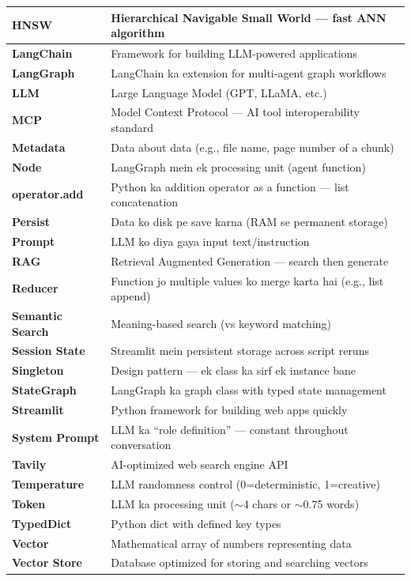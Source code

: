 \documentclass[12pt, a4paper]{article}
\begin{document}
\begin{longtable}{|>{\bfseries\small}p{4cm}|p{9.5cm}|}
HNSW & Hierarchical Navigable Small World --- fast ANN algorithm \\
\hline
LangChain & Framework for building LLM-powered applications \\
\hline
LangGraph & LangChain ka extension for multi-agent graph workflows \\
\hline
LLM & Large Language Model (GPT, LLaMA, etc.) \\
\hline
MCP & Model Context Protocol --- AI tool interoperability standard \\
\hline
Metadata & Data about data (e.g., file name, page number of a chunk) \\
\hline
Node & LangGraph mein ek processing unit (agent function) \\
\hline
operator.add & Python ka addition operator as a function --- list concatenation \\
\hline
Persist & Data ko disk pe save karna (RAM se permanent storage) \\
\hline
Prompt & LLM ko diya gaya input text/instruction \\
\hline
RAG & Retrieval Augmented Generation --- search then generate \\
\hline
Reducer & Function jo multiple values ko merge karta hai (e.g., list append) \\
\hline
Semantic Search & Meaning-based search (vs keyword matching) \\
\hline
Session State & Streamlit mein persistent storage across script reruns \\
\hline
Singleton & Design pattern --- ek class ka sirf ek instance bane \\
\hline
StateGraph & LangGraph ka graph class with typed state management \\
\hline
Streamlit & Python framework for building web apps quickly \\
\hline
System Prompt & LLM ka ``role definition'' --- constant throughout conversation \\
\hline
Tavily & AI-optimized web search engine API \\
\hline
Temperature & LLM randomness control (0=deterministic, 1=creative) \\
\hline
Token & LLM ka processing unit ($\sim$4 chars or $\sim$0.75 words) \\
\hline
TypedDict & Python dict with defined key types \\
\hline
Vector & Mathematical array of numbers representing data \\
\hline
Vector Store & Database optimized for storing and searching vectors \\
\hline
\end{longtable}
\end{document}

